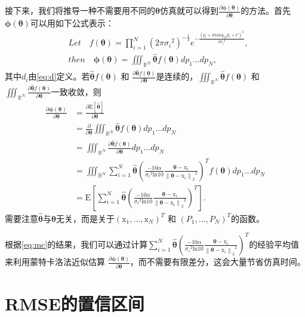 接下来，我们将推导一种不需要用不同的$\bm\theta$仿真就可以得到${\frac{\partial\bm\phi(\bm{\theta})}{\partial \bm\theta}}$的方法。首先 $\bm\phi(\bm{\theta})$可以用如下公式表示：
\begin{equation}
\begin{split}
&Let \quad f(\bm{\theta}) = {\prod\limits_{i=1}^N}(2\pi{\sigma_i}^2)^{-\frac{1}{2}}e^{-\frac{(p_i + 10\alpha\mathrm{log}_{10}{d_i} + C)^2}{2{\sigma_i}^2}},\\
&then \quad \bm\phi(\bm{\theta}) = \iiint_{\mathbb{R}^N}\widehat{\bm{\theta}}f(\bm{\theta})dp_1...dp_N,
\end{split}
\end{equation}
其中$d_i$由\eqref{eq:d}定义。若$\widehat{\bm{\theta}}f(\bm{\theta})$ 和 $\frac{\partial \widehat{\bm{\theta}}f(\bm\theta)}{\partial \bm{\theta}}$是连续的，$\iiint_{\mathbb{R}^N}\widehat{\bm{\theta}}f(\bm\theta)$ 和 $\iiint_{\mathbb{R}^N}\frac{\partial \widehat{\bm{\theta}}f(\bm\theta)}{\partial \bm{\theta}}$一致收敛，则
\begin{equation}
\begin{split}
{\frac{\partial\bm\phi(\bm{\theta})}{\partial \bm\theta}} &= \frac{\partial\mathrm{E}[\widehat{\bm{\theta}}]}{\partial \bm{\theta}}\\
&= \frac{\partial}{\partial \bm{\theta}}\iiint_{\mathbb{R}^N} \widehat{\bm{\theta}}f(\bm{\theta}) dp_1...dp_N\\
&= \iiint_{\mathbb{R}^N} \frac{\partial \widehat{\bm{\theta}}f(\bm{\theta})}{\partial \bm{\theta}} dp_1...dp_N\\
&= \iiint_{\mathbb{R}^N} \sum\limits_{i=1}^N \widehat{\bm{\theta}}(\frac{-10\alpha}{{\sigma_i}^2\mathrm{ln}10}\frac{{\bm\theta} - \bm{\mathrm{x}}_i}{{\left\|{\bm\theta} - \bm{\mathrm{x}}_i\right\|_2}^2})^Tf(\bm{\theta}) dp_1...dp_N\\
&= \mathrm{E}[\sum\limits_{i=1}^N\widehat{\bm{\theta}}(\frac{-10\alpha}{{\sigma_i}^2\mathrm{ln}10}\frac{{\bm\theta} - \bm{\mathrm{x}}_i}{{\left\|{\bm\theta} - \bm{\mathrm{x}}_i\right\|_2}^2})^T]. \label{eq:mc}
\end{split}
\end{equation}
需要注意$\widehat{\bm{\theta}}$与$\bm{\theta}$无关，而是关于$(\bm{\mathrm{x}}_1,...,\bm{\mathrm{x}}_N)^T$ 和 $(P_1,...,P_N)^T$的函数。

根据\eqref{eq:mc}的结果，我们可以通过计算$\sum\limits_{i=1}^N\widehat{\bm{\theta}}(\frac{-10\alpha}{{\sigma_i}^2\mathrm{ln}10}\frac{{\bm\theta} - \bm{\mathrm{x}}_i}{{\left\|{\bm\theta} - \bm{\mathrm{x}}_i\right\|_2}^2})^T$的经验平均值来利用蒙特卡洛法近似估算 ${\frac{\partial\bm\phi(\bm{\theta})}{\partial \bm\theta}}$，而不需要有限差分，这会大量节省仿真时间。

\section{RMSE的置信区间}







